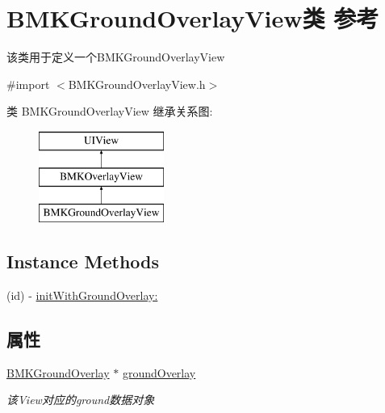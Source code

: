 \hypertarget{interface_b_m_k_ground_overlay_view}{}\section{B\+M\+K\+Ground\+Overlay\+View类 参考}
\label{interface_b_m_k_ground_overlay_view}


该类用于定义一个\+B\+M\+K\+Ground\+Overlay\+View  




{\ttfamily \#import $<$B\+M\+K\+Ground\+Overlay\+View.\+h$>$}

类 B\+M\+K\+Ground\+Overlay\+View 继承关系图\+:\begin{figure}[H]
\begin{center}
\leavevmode
\includegraphics[height=3.000000cm]{interface_b_m_k_ground_overlay_view}
\end{center}
\end{figure}
\subsection*{Instance Methods}
\begin{DoxyCompactItemize}
\item 
(id) -\/ \hyperlink{interface_b_m_k_ground_overlay_view_a9a2e7f5341b40608aff7e8e70f219800}{init\+With\+Ground\+Overlay\+:}
\end{DoxyCompactItemize}
\subsection*{属性}
\begin{DoxyCompactItemize}
\item 
\hypertarget{interface_b_m_k_ground_overlay_view_afe3e5c81b5ba3b9a47dda8d3593fd8f2}{}\hyperlink{interface_b_m_k_ground_overlay}{B\+M\+K\+Ground\+Overlay} $\ast$ \hyperlink{interface_b_m_k_ground_overlay_view_afe3e5c81b5ba3b9a47dda8d3593fd8f2}{ground\+Overlay}\label{interface_b_m_k_ground_overlay_view_afe3e5c81b5ba3b9a47dda8d3593fd8f2}

\begin{DoxyCompactList}\small\item\em 该\+View对应的ground数据对象 \end{DoxyCompactList}\end{DoxyCompactItemize}
